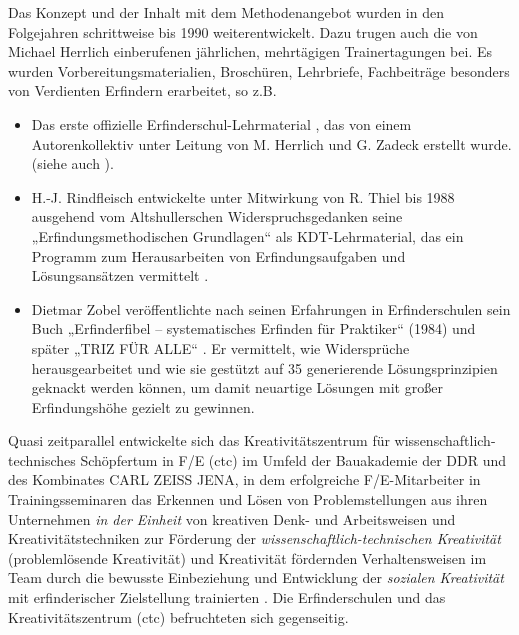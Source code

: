 \documentclass[11pt,a4paper]{article}
\begin{document}
Das Konzept und der Inhalt mit dem Methodenangebot wurden in den Folgejahren
schrittweise bis 1990 weiterentwickelt. Dazu trugen auch die von Michael
Herrlich einberufenen jährlichen, mehrtägigen Trainertagungen bei. Es wurden
Vorbereitungsmaterialien, Broschü\-ren, Lehrbriefe, Fachbeiträge besonders von
Verdienten Erfindern erarbeitet, so z.B.
\begin{itemize}
\item Das erste offizielle Erfinderschul-Lehrmaterial \cite{7}, das von einem
  Autorenkollektiv unter Leitung von M. Herrlich und G. Zadeck erstellt wurde.
  (siehe auch \cite{19}).
\item H.-J. Rindfleisch entwickelte unter Mitwirkung von R. Thiel bis 1988
  ausgehend vom Altshullerschen Widerspruchsgedanken seine
  „Erfindungsmethodischen Grundlagen“ als KDT-Lehrmaterial, das ein Programm
  zum Herausarbeiten von Erfindungsaufgaben und Lösungsansätzen vermittelt
  \cite{8}.
\item Dietmar Zobel veröffentlichte nach seinen Erfahrungen in Erfinderschulen
  sein Buch „Erfinderfibel – systematisches Erfinden für Praktiker“ \cite{9.1}
  (1984) und später „TRIZ FÜR ALLE“ \cite{9.3}. Er vermittelt, wie
  Widersprüche herausgearbeitet und wie sie gestützt auf 35 generierende
  Lösungsprinzipien geknackt werden können, um damit neuartige Lösungen mit
  großer Erfindungshöhe gezielt zu gewinnen.
\end{itemize}
Quasi zeitparallel entwickelte sich das Kreativitätszentrum für
wissenschaftlich-technisches Schöpfertum in F/E (ctc) im Umfeld der
Bauakademie der DDR und des Kombinates CARL ZEISS JENA, in dem erfolgreiche
F/E-Mitarbeiter in Trainingsseminaren das Erkennen und Lösen von
Problemstellungen aus ihren Unternehmen \emph{in der Einheit} von kreativen
Denk- und Arbeitsweisen und Kreativitätstechniken zur Förderung der
\emph{wissenschaftlich-technischen Kreativität} (problemlösende Kreativität)
und Kreativität fördernden Verhaltensweisen im Team durch die bewusste
Einbeziehung und Entwicklung der \emph{sozialen Kreativität} mit
erfinderischer Zielstellung trainierten \cite{10,11}. Die Erfinderschulen und
das Kreativitätszentrum (ctc) befruchteten sich gegenseitig.
    
\end{document}
